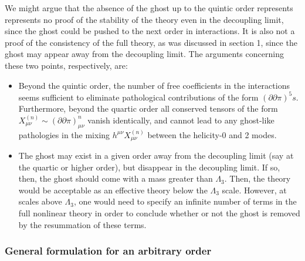 \documentclass{book}
\theoremstyle{definition}
\newcommand{\p}{\partial}
\begin{document}
We might argue that the absence of the ghost up to the quintic order represents represents no proof of
the stability of the theory even in the decoupling limit, since the ghost could be
pushed to the next order in interactions. It is also not a proof of the consistency of
the full theory, as was discussed in section 1, since the ghost may appear away from
the decoupling limit. The arguments concerning these two points, respectively, are:
\begin{itemize}
	\item Beyond the quintic order, the number of free coefficients in the interactions
	seems sufficient to eliminate pathological contributions of the form $(\p \p \pi)^5s$. Furthermore, beyond the quartic order all conserved tensors of the form $X_{\mu\nu}^{(n)} \sim (\p \p \pi)^n_{\mu\nu}$ vanish identically, and cannot lead to any ghost-like pathologies in the
	mixing $ h^{\mu\nu}X_{\mu\nu}^{(n)} $ between the helicity-0 and 2 modes.

	\item The ghost may exist in a given order away from the decoupling limit (say at
	the quartic or higher order), but disappear in the decoupling limit. If so, then,
	the ghost should come with a mass greater than $\Lambda_3$. Then, the theory would
	be acceptable as an effective theory below the $\Lambda_3$ scale. However, at scales
	above $\Lambda_3$, one would need to specify an infinite number of terms in the full
	nonlinear theory in order to conclude whether or not the ghost is removed by
	the resummation of these terms. 
\end{itemize}
























\newpage
\subsubsection{General formulation for an arbitrary order}
\end{document}
